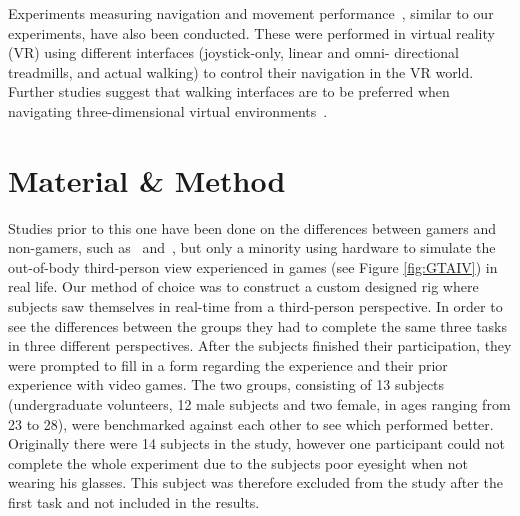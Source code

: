 \documentclass[runningheads,a4paper,oribibl]{llncs}
\begin{document}
Experiments measuring navigation and movement performance~\cite{ruddle2013learning}, similar to our experiments, have also been conducted. These were performed in virtual reality (VR) using different interfaces (joystick-only, linear and omni- directional treadmills, and actual walking) to control their navigation in the VR world. Further studies suggest that walking interfaces are to be preferred when navigating three-dimensional virtual environments~\cite{ruddle2009benefits}.























\section{Material \& Method}
Studies prior to this one have been done on the differences between gamers and non-gamers, such as~\cite{schmierbach2011exploring} and~\cite{gong2015enhanced}, but only a minority using hardware to simulate the out-of-body third-person view experienced in games (see Figure \ref{fig:GTAIV}) in real life. Our method of choice was to construct a custom designed rig where subjects saw themselves in real-time from a third-person perspective. In order to see the differences between the groups they had to complete the same three tasks in three different perspectives. After the subjects finished their participation, they were prompted to fill in a form regarding the experience and their prior experience with video games. The two groups, consisting of 13 subjects (undergraduate volunteers, 12 male subjects and two female, in ages ranging from 23 to 28), were benchmarked against each other to see which performed better. Originally there were 14 subjects in the study, however one participant could not complete the whole experiment due to the subjects poor eyesight when not wearing his glasses. This subject was therefore excluded from the study after the first task and not included in the results.
\end{document}
